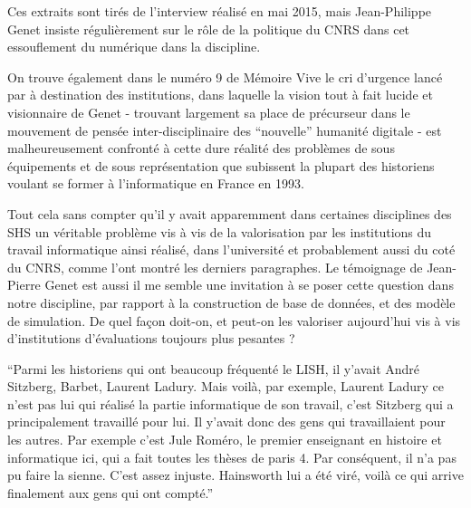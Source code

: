 Ces extraits sont tirés de l'interview réalisé en mai 2015, mais Jean-Philippe Genet insiste régulièrement sur le rôle de la politique du CNRS dans cet essouflement du numérique dans la discipline.

On trouve également dans le numéro 9 de Mémoire Vive le cri d'urgence lancé par \textcite{Genet1993} à destination des institutions, dans laquelle la vision tout à fait lucide et visionnaire de Genet - trouvant largement sa place de précurseur dans le mouvement de pensée inter-disciplinaire des \enquote{nouvelle} humanité digitale  - est malheureusement confronté à cette dure réalité des problèmes de sous équipements et de sous représentation que subissent la plupart des historiens voulant se former à l'informatique en France en 1993.

Tout cela sans compter qu'il y avait apparemment dans certaines disciplines des SHS un véritable problème vis à vis de la valorisation par les institutions du travail informatique ainsi réalisé, dans l'université et probablement aussi du coté du CNRS, comme l'ont montré les derniers paragraphes. Le témoignage de Jean-Pierre Genet est aussi il me semble une invitation à se poser cette question dans notre discipline, par rapport à la construction de base de données, et des modèle de simulation. De quel façon doit-on, et peut-on les valoriser aujourd'hui vis à vis d'institutions d'évaluations toujours plus pesantes ?

\enquote{Parmi les historiens qui ont beaucoup fréquenté le LISH, il y'avait André Sitzberg, Barbet, Laurent Ladury. Mais voilà, par exemple, Laurent Ladury ce n'est pas lui qui réalisé la partie informatique de son travail, c'est Sitzberg qui a principalement travaillé pour lui. Il y'avait donc des gens qui travaillaient pour les autres. Par exemple c'est Jule Roméro, le premier enseignant en histoire et informatique ici, qui a fait toutes les thèses de paris 4. Par conséquent, il n'a pas pu faire la sienne. C'est assez injuste. Hainsworth lui a été viré, voilà ce qui arrive finalement aux gens qui ont compté.}

